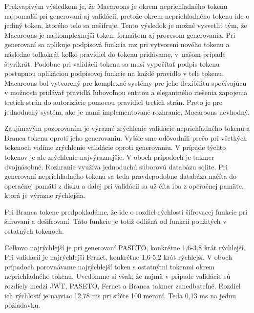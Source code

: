 Prekvapivým výsledkom je, že Macaroons je okrem nepriehľadného tokenu najpomalší pri generovaní aj validácii, pretože okrem nepriehľadného tokenu ide o jediný token, ktorého telo sa nešifruje. Tento výsledok je možné vysvetliť tým, že Macaroons je najkomplexnejší token, formátom aj procesom generovania. Pri generovaní sa aplikuje podpisová funkcia raz pri vytvorení nového tokenu a následne toľkokrát koľko pravidiel do tokenu pridávame, v~našom prípade štyrikrát. Podobne pri validácii tokenu sa musí vypočítať podpis tokenu postupnou aplikáciou podpisovej funkcie na každé pravidlo v tele tokenu. Macaroons bol vytvorený pre komplexné systémy pre jeho flexibilitu spočívajúcu v možnosti pridávať pravidlá ľubovoľnou entitou a elegantného riešenia zapojenia tretích strán do autorizácie pomocou pravidiel tretích strán. Preto je pre jednoduchý systém, ako je nami implementované rozhranie, Macaroons nevhodný.

Zaujímavým pozorovaním je výrazné zrýchlenie validácie nepriehľadného tokenu a Branca tokenu oproti jeho generovaniu. Vyššie sme odôvodnili prečo pri všetkých tokenoch vidíme zrýchlenie validácie oproti generovaniu. V prípade týchto tokenov je ale zrýchlenie najvýraznejšie. V oboch prípadoch je takmer dvojnásobné. Rozhranie využíva jednoduchú súborovú databázu sqlite. Pri generovaní nepriehľadného tokenu sa teda pravdepodobne databáza načíta do operačnej pamäti z disku a ďalej pri validácii sa už číta iba z operačnej pamäte, ktorá je výrazne rýchlejšia.

Pri Branca tokene predpokladáme, že ide o rozdiel rýchlosti šifrovacej funkcie pri šifrovaní a dešifrovaní. Táto funkcie je totiž odlišná od funkcií použitých v ostatných tokenoch.

Celkovo najrýchlejší je pri generovaní PASETO, konkrétne 1,6-3,8 krát rýchlejší. Pri validácii je najrýchlejší Fernet, konkrétne 1,6-5,2 krát rýchlejší. V oboch prípadoch porovnávame najrýchlejší token s ostatnými tokenmi okrem nepriehľadného tokenu. Uvedomme si však, že najmä v prípade validácie sú rozdiely medzi JWT, PASETO, Fernet a Branca takmer zanedbateľné. Rozdiel ich rýchlostí je najviac 12,78 ms pri súčte 100 meraní. Teda 0,13 ms na jednu požiadavku.